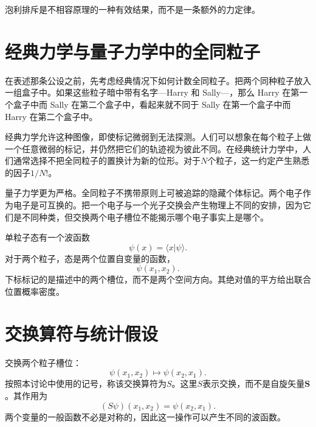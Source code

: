 \begin{classroomqa}
\end{classroomqa}

泡利排斥是不相容原理的一种有效结果，而不是一条额外的力定律。

\begin{classroomqa}
\end{classroomqa}

\section{经典力学与量子力学中的全同粒子}

在表述那条公设之前，先考虑经典情况下如何计数全同粒子。把两个同种粒子放入一组盒子中。如果这些粒子暗中带有名字---Harry 和 Sally---，那么 Harry 在第一个盒子中而 Sally 在第二个盒子中，看起来就不同于 Sally 在第一个盒子中而 Harry 在第二个盒子中。

经典力学允许这种图像，即使标记微弱到无法探测。人们可以想象在每个粒子上做一个任意微弱的标记，并仍然把它们的轨迹视为彼此不同。在经典统计力学中，人们通常选择不把全同粒子的置换计为新的位形。对于\(N\)个粒子，这一约定产生熟悉的因子\(1/N!\)。

量子力学更为严格。全同粒子不携带原则上可被追踪的隐藏个体标记。两个电子作为电子是可互换的。把一个电子与一个光子交换会产生物理上不同的安排，因为它们是不同种类，但交换两个电子槽位不能揭示哪个电子事实上是哪个。

单粒子态有一个波函数
\[
\psi(x)=\langle x\vert\psi\rangle.
\]
对于两个粒子，态是两个位置自变量的函数，
\begin{equation}
\psi(x_{1},x_{2}).
\end{equation}
下标标记的是描述中的两个槽位，而不是两个空间方向。其绝对值的平方给出联合位置概率密度。

\section{交换算符与统计假设}

交换两个粒子槽位：
\begin{equation}
\psi(x_{1},x_{2})\longmapsto\psi(x_{2},x_{1}).
\end{equation}
按照本讨论中使用的记号，称该交换算符为\(S\)。这里\(S\)表示交换，而不是自旋矢量\(\mathbf S\)。其作用为
\begin{equation}
(S\psi)(x_{1},x_{2})=\psi(x_{2},x_{1}).
\end{equation}
两个变量的一般函数不必是对称的，因此这一操作可以产生不同的波函数。

